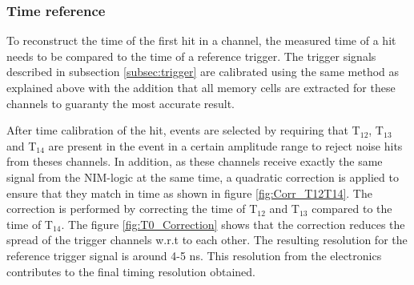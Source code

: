 \subsubsection{Time reference}
\label{subsection:time_ref}

To reconstruct the time of the first hit in a channel, the measured time of a hit needs to be compared to the time of a reference trigger. The trigger signals described in subsection \ref{subsec:trigger} are calibrated using the same method as explained above with the addition that all memory cells are extracted for these channels to guaranty the most accurate result.

After time calibration of the hit, events are selected by requiring that T$_{12}$, T$_{13}$ and T$_{14}$ are present in the event in a certain amplitude range to reject noise hits from theses channels. In addition, as these channels receive exactly the same signal from the NIM-logic at the same time, a quadratic correction is applied to ensure that they match in time as shown in figure \ref{fig:Corr_T12T14}. The correction is performed by correcting the time of T$_{12}$ and T$_{13}$ compared to the time of T$_{14}$. The figure \ref{fig:T0_Correction} shows that the correction reduces the spread of the trigger channels w.r.t to each other. The resulting resolution for the reference trigger signal is around 4-5 ns. This resolution from the electronics contributes to the final timing resolution obtained.

